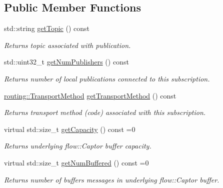 \subsection*{Public Member Functions}
\begin{DoxyCompactItemize}
\item 
std\+::string \hyperlink{classflow__ros_1_1_subscriber_base_a3af4148c9a1fef17b9243116260455c7}{get\+Topic} () const
\begin{DoxyCompactList}\small\item\em Returns topic associated with publication. \end{DoxyCompactList}\item 
std\+::uint32\+\_\+t \hyperlink{classflow__ros_1_1_subscriber_base_aabaa5a35708ea005c95b2ab206bc172e}{get\+Num\+Publishers} () const
\begin{DoxyCompactList}\small\item\em Returns number of local publications connected to this subscription. \end{DoxyCompactList}\item 
\hyperlink{transport__info_8h_ae57afcf849a5bdb82b958347c6ccc57b}{routing\+::\+Transport\+Method} \hyperlink{classflow__ros_1_1_subscriber_base_ae68b6a76c0ffc8d2fd8080206f7ce891}{get\+Transport\+Method} () const
\begin{DoxyCompactList}\small\item\em Returns transport method (code) associated with this subscription. \end{DoxyCompactList}\item 
\mbox{\label{classflow__ros_1_1_subscriber_base_a25536a5f4b8a3c3dba3b581647e161b5}} 
virtual std\+::size\+\_\+t \hyperlink{classflow__ros_1_1_subscriber_base_a25536a5f4b8a3c3dba3b581647e161b5}{get\+Capacity} () const =0
\begin{DoxyCompactList}\small\item\em Returns underlying {\ttfamily flow\+::\+Captor} buffer capacity. \end{DoxyCompactList}\item 
\mbox{\label{classflow__ros_1_1_subscriber_base_a65fa9835d2c8135a5b118279e5cf1588}} 
virtual std\+::size\+\_\+t \hyperlink{classflow__ros_1_1_subscriber_base_a65fa9835d2c8135a5b118279e5cf1588}{get\+Num\+Buffered} () const =0
\begin{DoxyCompactList}\small\item\em Returns number of buffers messages in underlying {\ttfamily flow\+::\+Captor} buffer. \end{DoxyCompactList}\item 

\end{DoxyCompactItemize}
